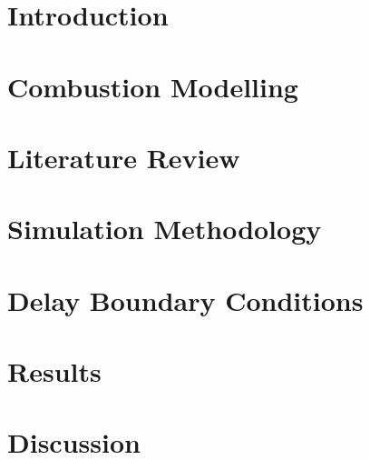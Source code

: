 \documentclass[lmr,second,hyperref,rgb,hyperref,dvipsnames]{uom_thesis_casson}
\title{\xmp@Title}
\author{\xmp@Author}
\begin{document}
\maketitle
\cleardoublepage

% 

\pagestyle{fancy}
\setcounter{page}{5}

\thispagestyle{empty}
\cleardoublepage

\uomtoc
\cleardoublepage

\uomstartmainbody %

\chapter{Introduction} \label{ch:intro}

\cleardoublepage

\chapter{Combustion Modelling} \label{ch:combust-model}

\cleardoublepage

\chapter{Literature Review} \label{ch:lit-review}

\cleardoublepage

\chapter{Simulation Methodology} \label{ch:dns-methods}

\cleardoublepage

% 

\chapter{Delay Boundary Conditions} \label{ch:delay-bcs}

\cleardoublepage

\chapter{Results} \label{ch:results}

\cleardoublepage

\chapter{Discussion} \label{ch:discuss}

\cleardoublepage

\printbibliography[title={References}, heading=bibintoc]
\end{document}
